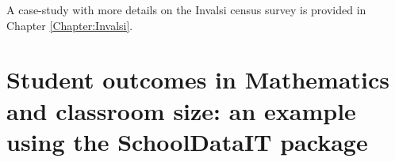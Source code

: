 \documentclass[openany]{book}
\begin{document}
A case-study with more details on the Invalsi census survey is provided in Chapter \ref{Chapter:Invalsi}.







\section[Usage Example]{Student outcomes in Mathematics and classroom size: an example using the SchoolDataIT package} \label{section:Example}
\end{document}
